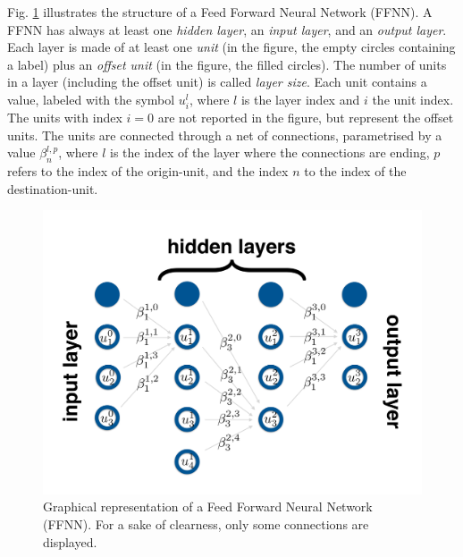 \documentclass[11pt,a4paper,twoside]{article}
\begin{document}
Fig. \ref{fig:FFNN} illustrates the structure of a Feed Forward Neural Network (FFNN).
A FFNN has always at least one \emph{hidden layer}, an \emph{input layer}, and an \emph{output layer}.
Each layer is made of at least one \emph{unit} (in the figure, the empty circles containing a label) plus an \emph{offset unit} (in the figure, the filled circles).
The number of units in a layer (including the offset unit) is called \emph{layer size}.
Each unit contains a value, labeled with the symbol $u^l_i$, where $l$ is the layer index and $i$ the unit index.
The units with index $i=0$ are not reported in the figure, but represent the offset units.
The units are connected through a net of connections, parametrised by a value $\beta^{l,p}_n$, where $l$ is the index of the layer where the connections are ending, $p$ refers to the index of the origin-unit, and the index $n$ to the index of the destination-unit.

\begin{figure}[htpb]
  \centering
  \includegraphics[width=.9\textwidth]{FFNN.pdf}
  \caption{Graphical representation of a Feed Forward Neural Network (FFNN). For a sake of clearness, only some connections are displayed.}
  \label{fig:FFNN}
\end{figure}
\end{document}
